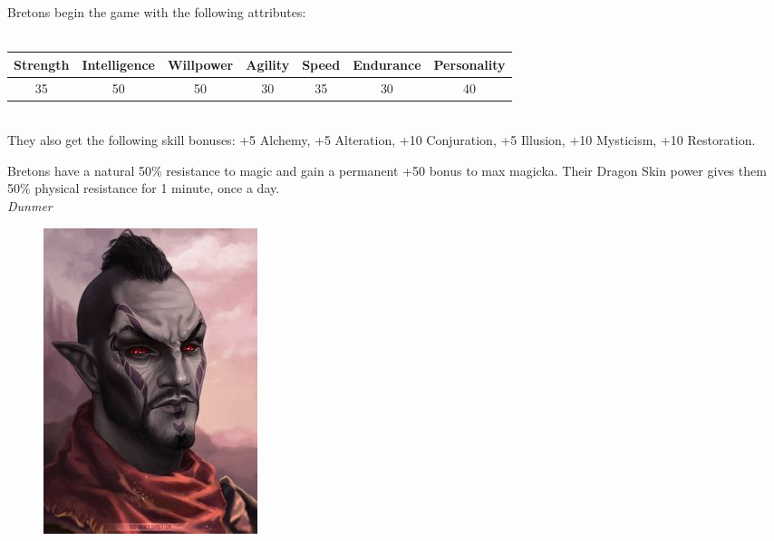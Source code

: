 \documentclass[12pt]{article}
\begin{document}
Bretons begin the game with the following attributes:\\~\\
\begin{tabular}{|c|c|c|c|c|c|c|}
\hline
Strength & Intelligence & Willpower & Agility & Speed & Endurance & Personality\\ \hline
35 & 50 & 50 & 30 & 35 & 30 & 40\\ \hline

\end{tabular}\\

They also get the following skill bonuses: +5 Alchemy, +5 Alteration, +10 Conjuration, +5 Illusion, +10 Mysticism, +10 Restoration.

Bretons have a natural 50\% resistance to magic and gain a permanent +50 bonus to max magicka. Their Dragon Skin power gives them 50\% physical resistance for 1 minute, once a day.\\

\noindent
\textit{Dunmer}
\begin{figure}
	\includegraphics[width=\textwidth]{Dunmer.png}
\end{figure}
\end{document}
